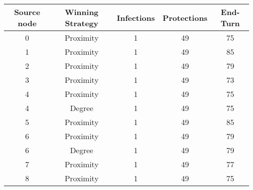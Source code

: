\documentclass[results.tex]{subfiles}
\begin{document}
    \begin{center}
        \begin{tabular}{| c || c | c | c | c |}
            \hline
            {\bfseries Source node} & {\bfseries Winning Strategy} & {\bfseries Infections} & {\bfseries Protections}
            & {\bfseries End-Turn}
            \\  %
            \hline\hline
            0                       & Proximity                    & 1                      & 49                      & 75                   \\
            \hline
            1                       & Proximity                    & 1                      & 49                      & 85                   \\
            \hline
            2                       & Proximity                    & 1                      & 49                      & 79                   \\
            \hline
            3                       & Proximity                    & 1                      & 49                      & 73                   \\
            \hline
            4                       & Proximity                    & 1                      & 49                      & 75                   \\
            \hline
            4                       & Degree                       & 1                      & 49                      & 75                   \\
            \hline
            5                       & Proximity                    & 1                      & 49                      & 85                   \\
            \hline
            6                       & Proximity                    & 1                      & 49                      & 79                   \\
            \hline
            6                       & Degree                       & 1                      & 49                      & 79                   \\
            \hline
            7                       & Proximity                    & 1                      & 49                      & 77                   \\
            \hline
            8                       & Proximity                    & 1                      & 49                      & 75                   \\

\end{tabular}
\end{center}
\end{document}
